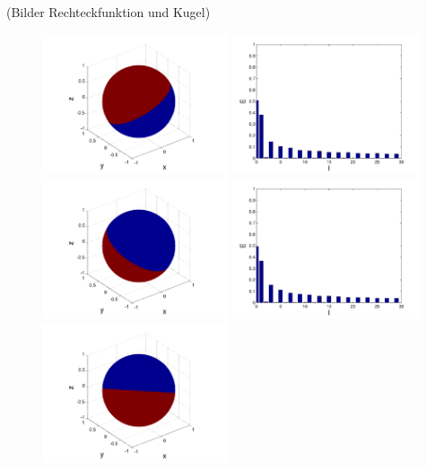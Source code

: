 \begin{refsection}
(Bilder Rechteckfunktion und Kugel)
\begin{figure}
\centering
\includegraphics[width=0.49\textwidth]{kugel/kSpektrum/Kugel_1_1.pdf}
\includegraphics[width=0.49\textwidth]{kugel/kSpektrum/Kugel_1_2.pdf}
\includegraphics[width=0.49\textwidth]{kugel/kSpektrum/Kugel_2_1.pdf}
\includegraphics[width=0.49\textwidth]{kugel/kSpektrum/Kugel_2_2.pdf}
\includegraphics[width=0.49\textwidth]{kugel/kSpektrum/Kugel_3_1.pdf}

\end{figure}
\end{refsection}
